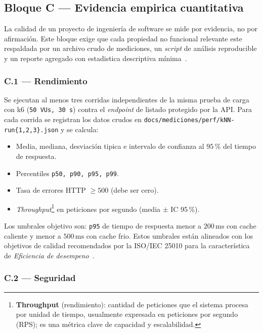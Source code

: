 \documentclass[11pt,a4paper]{article}
\begin{document}
\subsection{Bloque C --- Evidencia empirica cuantitativa}

La calidad de un proyecto de ingenier\'{i}a de software se mide por evidencia, no por afirmaci\'{o}n. Este bloque exige que cada propiedad no funcional relevante este respaldada por un archivo crudo de mediciones, un \emph{script} de an\'{a}lisis reproducible y un reporte agregado con estadistica descriptiva m\'{i}nima~\cite{wohlin2012experimentation,washizaki2024swebok}.

\subsubsection*{C.1 --- Rendimiento}

Se ejecutan al menos tres corridas independientes de la misma prueba de carga con k6 (\texttt{50 VUs, 30 s}) contra el \emph{endpoint} de listado protegido por la API. Para cada corrida se registran los datos crudos en \texttt{docs/mediciones/perf/kNN-run\{1,2,3\}.json} y se calcula:

\begin{itemize}
    \item Media, mediana, desviaci\'{o}n tipica e intervalo de confianza al $95$\,\% del tiempo de respuesta.
    \item Percentiles \texttt{p50, p90, p95, p99}.
    \item Tasa de errores HTTP $\geq 500$ (debe ser cero).
    \item \emph{Throughput}\footnote{\textbf{Throughput} (rendimiento): cantidad de peticiones que el sistema procesa por unidad de tiempo, usualmente expresada en peticiones por segundo (RPS); es una m\'{e}trica clave de capacidad y escalabilidad.} en peticiones por segundo (media $\pm$ IC 95\,\%).
\end{itemize}

Los umbrales objetivo son: \texttt{p95} de tiempo de respuesta menor a $200\,\text{ms}$ con cache caliente y menor a $500\,\text{ms}$ con cache frio. Estos umbrales est\'{a}n alineados con los objetivos de calidad recomendados por la ISO/IEC 25010 para la caracter\'{i}stica de \emph{Eficiencia de desempeno}~\cite{iso25010}.

\subsubsection*{C.2 --- Seguridad}
\end{document}
